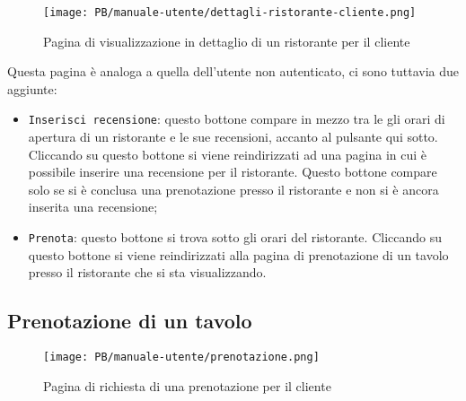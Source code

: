 \begin{figure}[htbp]
    \centering
	\texttt{[image: PB/manuale-utente/dettagli-ristorante-cliente.png]}
    \caption{Pagina di visualizzazione in dettaglio di un ristorante per il
	cliente}
\end{figure}

Questa pagina è analoga a quella dell'utente non autenticato, ci sono tuttavia
due aggiunte:
\begin{itemize}
	\item \texttt{Inserisci recensione}: questo bottone compare in mezzo tra le
		gli orari di apertura di un ristorante e le sue recensioni, accanto al
		pulsante qui sotto. Cliccando su questo bottone si viene reindirizzati
		ad una pagina in cui è possibile inserire una recensione per il
		ristorante. Questo bottone compare solo se si è conclusa una
		prenotazione presso il ristorante e non si è ancora inserita una
		recensione;

	\item \texttt{Prenota}: questo bottone si trova sotto gli orari del
		ristorante. Cliccando su questo bottone si viene reindirizzati alla
		pagina di prenotazione di un tavolo presso il ristorante che si sta
		visualizzando.
\end{itemize}

\subsection{Prenotazione di un tavolo}

\begin{figure}[htbp]
    \centering
	\texttt{[image: PB/manuale-utente/prenotazione.png]}
    \caption{Pagina di richiesta di una prenotazione per il cliente}
\end{figure}

